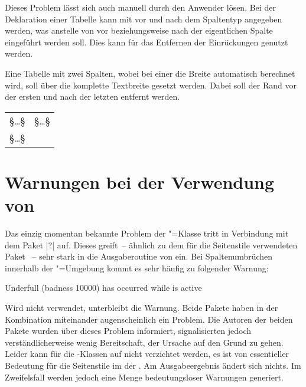 Dieses Problem lässt sich auch manuell durch den Anwender lösen. Bei der 
Deklaration einer Tabelle kann mit \PParameter{\dots} vor und 
nach dem Spaltentyp angegeben werden, was anstelle von  vor 
beziehungsweise nach der eigentlichen Spalte eingeführt werden soll. Dies kann 
für das Entfernen der Einrückungen genutzt werden.
%
\begin{Example}
Eine Tabelle mit zwei Spalten, wobei bei einer die Breite automatisch berechnet 
wird, soll über die komplette Textbreite gesetzt werden. Dabei soll der Rand 
vor der ersten und nach der letzten entfernt werden.
\begin{Code}[escapechar=§]
\begin{tabularx}{\textwidth}{@{}lX@{}}
§\dots§ & §\dots§ \tabularnewline
§\dots§
\end{tabularx}
\end{Code}
\end{Example}






\section{Warnungen bei der Verwendung von }
%
Das einzig momentan bekannte Problem der \TUDScript"=Klasse tritt in Verbindung 
mit dem Paket |?| auf. Dieses greift~-- ähnlich zu dem für 
die Seitenstile verwendeten Paket ~-- sehr stark in 
die Ausgaberoutine von  ein. Bei Spaltenumbrüchen innerhalb der 
"=Umgebung kommt es sehr häufig zu folgender Warnung:
%
\begin{quoting}
\begin{Code}
Underfull \hbox (badness 10000) has occurred while \output is active
\end{Code}
\end{quoting}
%
Wird  nicht verwendet, unterbleibt die Warnung. Beide 
Pakete haben in der Kombination miteinander augenscheinlich ein Problem. Die 
Autoren der beiden Pakete wurden über dieses Problem informiert, signalisierten 
jedoch verständlicherweise wenig Bereitschaft, der Ursache auf den Grund zu 
gehen. Leider kann für die \TUDScript-Klassen auf  
nicht verzichtet werden, es ist von essentieller Bedeutung für die Seitenstile 
im \CD der \TnUD. Am Ausgabeergebnis ändert sich nichts. Im Zweifelsfall werden 
jedoch eine Menge bedeutungsloser Warnungen generiert. 

